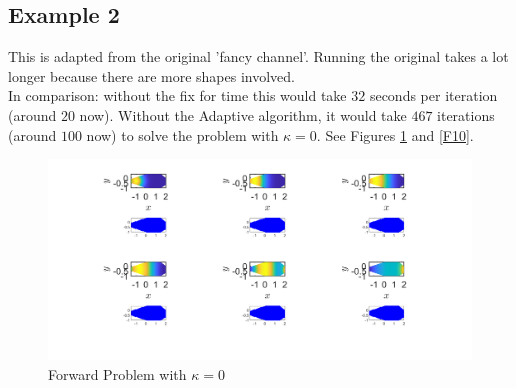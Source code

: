 \documentclass[11pt, a4paper]{article}
\theoremstyle{definition}
\begin{document}
\subsection{Example 2}
	This is adapted from the original 'fancy channel'. Running the original takes a lot longer because there are more shapes involved. \\
	In comparison: without the fix for time this would take $32$ seconds per iteration (around $20$ now). Without the Adaptive algorithm, it would take $467$ iterations (around $100$ now) to solve the problem with $\kappa = 0$. See Figures \ref{F9} and \ref{F10}.
    \begin{figure}[h]
		\centering
		\includegraphics[scale=0.35]{FWChannelk0.png}
		\caption{Forward Problem with $\kappa = 0$} 
		\label{F9}
	\end{figure}
	
\end{document}
